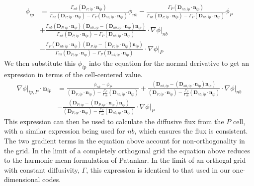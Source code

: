 \documentclass[11pt]{article}
\begin{document}
\begin{enumerate}
\begin{equation*}
\begin{aligned}
\phi_{ip} &=
\frac{\Gamma_{nb} (\textbf{D}_{P,ip} \cdot \textbf{n}_{ip})}
{\Gamma_{nb} (\textbf{D}_{P,ip} \cdot \textbf{n}_{ip})
- \Gamma_P (\textbf{D}_{nb,ip} \cdot \textbf{n}_{ip})} \phi_{nb}
- \frac{\Gamma_P (\textbf{D}_{nb,ip} \cdot \textbf{n}_{ip})}
{\Gamma_{nb} (\textbf{D}_{P,ip} \cdot \textbf{n}_{ip}) -
\Gamma_P (\textbf{D}_{nb,ip} \cdot \textbf{n}_{ip})} \phi_P
\\
&+  \frac{\Gamma_{nb} (\textbf{D}_{P,ip} \cdot \textbf{n}_{ip})(\textbf{D}_{nb,ip} -
(\textbf{D}_{nb,ip}\cdot\textbf{n}_{ip})\textbf{n}_{ip})}
{\Gamma_{nb} (\textbf{D}_{P,ip} \cdot \textbf{n}_{ip}) -
\Gamma_P (\textbf{D}_{nb,ip} \cdot \textbf{n}_{ip})} \cdot \left. \nabla \phi \right|_{nb}
\\
&-  \frac{\Gamma_P (\textbf{D}_{nb,ip} \cdot \textbf{n}_{ip})(\textbf{D}_{P,ip} - (\textbf{D}_{P,ip}\cdot\textbf{n}_{ip})\textbf{n}_{ip})}
{\Gamma_{nb} (\textbf{D}_{P,ip} \cdot \textbf{n}_{ip}) - \Gamma_P (\textbf{D}_{nb,ip} \cdot \textbf{n}_{ip})} \cdot \left. \nabla \phi \right|_P
\end{aligned}
\end{equation*}
We then substitute this \(\phi_{ip}\) into the equation for the normal derivative to get an expression
in terms of the cell-centered value.
\begin{equation*}
\begin{aligned}
\left. \nabla \phi \right|_{ip,P} \cdot \textbf{n}_{ip} &=
    \frac{\phi_{nb} - \phi_P}
    {(\textbf{D}_{P,ip}\cdot\textbf{n}_{ip}) - \frac{\Gamma_P}{\Gamma_{nb}}(\textbf{D}_{nb,ip}\cdot\textbf{n}_{ip})}
    + \frac{(\textbf{D}_{nb,ip}-(\textbf{D}_{nb,ip}\cdot\textbf{n}_{ip})\textbf{n}_{ip})}
    {(\textbf{D}_{P,ip} \cdot \textbf{n}_{ip}) - \frac{\Gamma_P}{\Gamma_{nb}}(\textbf{D}_{nb,ip} \cdot \textbf{n}_{ip})} \cdot\left.\nabla \phi \right|_{nb}
    \\
    &- \frac{(\textbf{D}_{P,ip}-(\textbf{D}_{P,ip}\cdot\textbf{n}_{ip})\textbf{n}_{ip})}
    {(\textbf{D}_{P,ip} \cdot \textbf{n}_{ip}) - \frac{\Gamma_P}{\Gamma_{nb}}(\textbf{D}_{nb,ip} \cdot \textbf{n}_{ip})} \cdot\left.\nabla \phi \right|_P
\end{aligned}
\end{equation*}
This expression can then be used to calculate the diffusive flux from the \(P\) cell, with a similar
expression being used for \(nb\), which ensures the flux is consistent. The two gradient terms in the
equation above account for non-orthogonality in the grid. In the limit of a completely orthogonal
grid the equation above reduces to the harmonic mean formulation of Patankar. In the
limit of an orthogal grid with constant diffusivity, \(\Gamma\), this expression is identical to
that used in our one-dimensional codes.
\end{enumerate}
\end{document}
